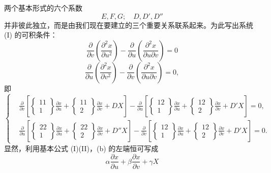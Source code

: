 两个基本形式的六个系数
\[
 E,F,G;\quad D,D',D''
\]
并非彼此独立，而是由我们现在要建立的三个重要关系联系起来。为此写出系统 (I) 的可积条件：
\[
 \frac{\partial}{\partial v}\left(\frac{\partial^2x}{\partial u^2}\right)
 -
 \frac{\partial}{\partial u}\left(\frac{\partial^2x}{\partial u\partial v}\right)=0
\]
\[
 \frac{\partial}{\partial u}\left(\frac{\partial^2x}{\partial v^2}\right)
 -
 \frac{\partial}{\partial v}\left(\frac{\partial^2x}{\partial u\partial v}\right)=0,
\]
即
\begin{equation}\tag{b}
\left\{
\begin{aligned}
&\frac{\partial}{\partial v}\!\left[
\left\{\begin{matrix}11\\1\end{matrix}\right\}\frac{\partial x}{\partial u}
+\left\{\begin{matrix}11\\2\end{matrix}\right\}\frac{\partial x}{\partial v}
+D X\right]
-\frac{\partial}{\partial u}\!\left[
\left\{\begin{matrix}12\\1\end{matrix}\right\}\frac{\partial x}{\partial u}
+\left\{\begin{matrix}12\\2\end{matrix}\right\}\frac{\partial x}{\partial v}
+D' X\right]=0,\\
&\frac{\partial}{\partial u}\!\left[
\left\{\begin{matrix}22\\1\end{matrix}\right\}\frac{\partial x}{\partial u}
+\left\{\begin{matrix}22\\2\end{matrix}\right\}\frac{\partial x}{\partial v}
+D'' X\right]
-\frac{\partial}{\partial v}\!\left[
\left\{\begin{matrix}12\\1\end{matrix}\right\}\frac{\partial x}{\partial u}
+\left\{\begin{matrix}12\\2\end{matrix}\right\}\frac{\partial x}{\partial v}
+D' X\right]=0.
\end{aligned}
\right.
\end{equation}
显然，利用基本公式 (I)(II)，(b) 的左端恒可写成
\[
 \alpha\frac{\partial x}{\partial u}+\beta\frac{\partial x}{\partial v}+\gamma X
\]
